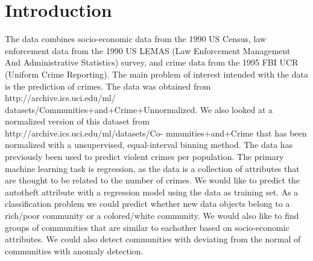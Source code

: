 \documentclass[a4paper,10pt]{article}
\begin{document}
\author{Valentin Rosenberg, Zacharias Dyna Knudsen}
\date{\today}

\tableofcontents
\newpage

\section{Introduction}
The data combines socio-economic data from the 1990 US Census, law enforcement data from the 1990 US LEMAS (Law Enforcement Management And Administrative Statistics) survey, and crime data from the 1995 FBI UCR (Uniform Crime Reporting). The main problem of interest intended with the data is the prediction of crimes.
The data was obtained from http://archive.ics.uci.edu/ml/\newline
datasets/Communities+and+Crime+Unnormalized. We also looked at a normalized version of this dataset from http://archive.ics.uci.edu/ml/datasets/Co-\newline
mmunities+and+Crime that has been normalized with a unsupervised, equal-interval binning method. The data has previously been used to predict violent crimes per population. 
The primary machine learning task is regression, as the data is a collection of attributes that are thought to be related to the number of crimes. We would like to predict the autotheft attribute with a regression model using the data as training set. As a classification problem we could predict whether new data objects belong to a rich/poor community or a colored/white community. We would also like to find groups of communities that are similar to eachother based on socio-economic attributes. We could also detect communities with deviating from the normal of communities with anomaly detection. 
\end{document}
